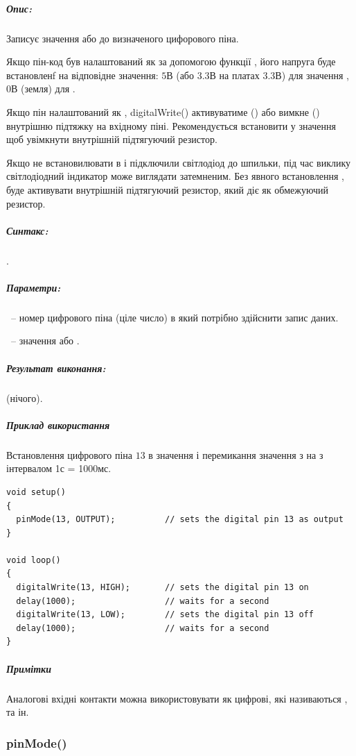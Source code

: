 \documentclass[12pt,a4paper]{report}  %
\begin{document}
\subparagraph{Опис:} Записує значення  або  до визначеного цифорового піна.

Якщо пін-код був налаштований як  за допомогою функції , його напруга буде встановленf на відповідне значення: $5$В (або $3.3$В на платах $3.3$В) для значення , $0$В (земля) для .

Якщо пін налаштований як , digitalWrite() активуватиме () або вимкне () внутрішню підтяжку на вхідному піні. Рекомендується встановити  у значення  щоб увімкнути внутрішній підтягуючий резистор.

Якщо не встановилювати  в  і підключили світлодіод до шпильки, під час виклику  світлодіодний індикатор може виглядати затемненим. Без явного встановлення ,  буде активувати внутрішній підтягуючий резистор, який діє як обмежуючий резистор.

\subparagraph{Синтакс:} .
\subparagraph{Параметри:} ~-- номер цифрового піна (ціле число) в який потрібно здійснити запис даних.

~-- значення  або .
\subparagraph{Результат виконання:}  (нічого).

\subparagraph{Приклад використання}

Встановлення цифрового піна $13$ в значення  і перемикання значення з  на  з інтервалом 1с = 1000мс.

\begin{lstlisting}[label=digitalwrite,caption=Використання функції digitalWrite()]
void setup()
{
  pinMode(13, OUTPUT);          // sets the digital pin 13 as output
}

void loop()
{
  digitalWrite(13, HIGH);       // sets the digital pin 13 on
  delay(1000);                  // waits for a second
  digitalWrite(13, LOW);        // sets the digital pin 13 off
  delay(1000);                  // waits for a second
}
\end{lstlisting}
\subparagraph{Примітки} Аналогові вхідні контакти можна використовувати як цифрові, які називаються ,  та ін.

\subsubsection{pinMode()}
\end{document}
